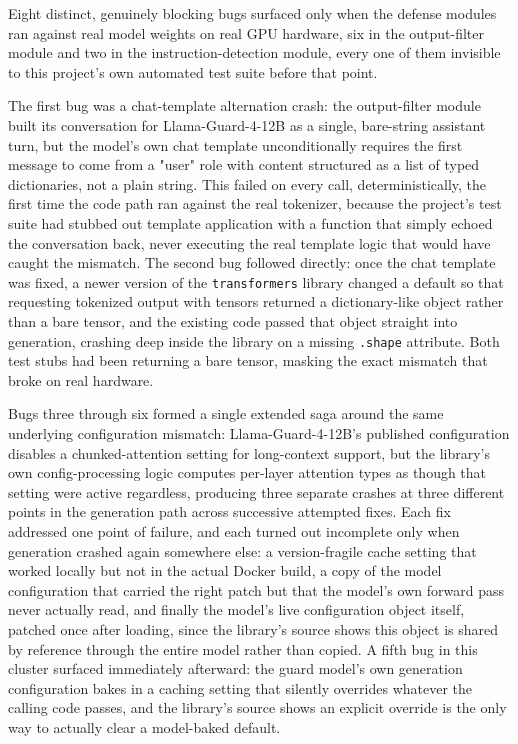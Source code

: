 Eight distinct, genuinely blocking bugs surfaced only when the defense
modules ran against real model weights on real GPU hardware, six in the
output-filter module and two in the instruction-detection module, every
one of them invisible to this project's own automated test suite before
that point.

The first bug was a chat-template alternation crash: the output-filter
module built its conversation for Llama-Guard-4-12B as a single,
bare-string assistant turn, but the model's own chat template
unconditionally requires the first message to come from a "user" role
with content structured as a list of typed dictionaries, not a plain
string. This failed on every call, deterministically, the first time the
code path ran against the real tokenizer, because the project's test
suite had stubbed out template application with a function that simply
echoed the conversation back, never executing the real template logic
that would have caught the mismatch. The second bug followed directly:
once the chat template was fixed, a newer version of the
\texttt{transformers} library changed a default so that requesting
tokenized output with tensors returned a dictionary-like object rather
than a bare tensor, and the existing code passed that object straight
into generation, crashing deep inside the library on a missing
\texttt{.shape} attribute. Both test stubs had been returning a bare
tensor, masking the exact mismatch that broke on real hardware.

Bugs three through six formed a single extended saga around the same
underlying configuration mismatch: Llama-Guard-4-12B's published
configuration disables a chunked-attention setting for long-context
support, but the library's own config-processing logic computes
per-layer attention types as though that setting were active regardless,
producing three separate crashes at three different points in the
generation path across successive attempted fixes. Each fix addressed
one point of failure, and each turned out incomplete only when
generation crashed again somewhere else: a version-fragile cache setting
that worked locally but not in the actual Docker build, a copy of the
model configuration that carried the right patch but that the model's
own forward pass never actually read, and finally the model's live
configuration object itself, patched once after loading, since the
library's source shows this object is shared by reference through the
entire model rather than copied. A fifth bug in this cluster surfaced
immediately afterward: the guard model's own generation configuration
bakes in a caching setting that silently overrides whatever the calling
code passes, and the library's source shows an explicit override is the
only way to actually clear a model-baked default.

